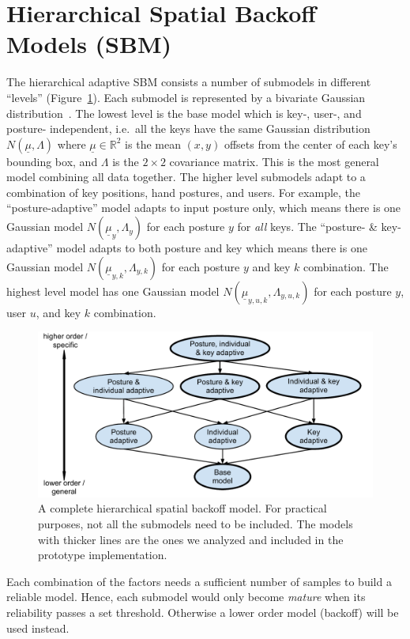 \documentclass{sigchi}
\begin{document}
\section{Hierarchical Spatial Backoff Models (SBM)}
The hierarchical adaptive SBM consists a number of submodels in different
``levels'' (Figure~\ref{fig:hierarchy}). Each submodel is represented by a
bivariate Gaussian distribution~\cite{Azenkot:2012,
Goodman:2002, Rashid:2008}.
The lowest level is the base model which is key-, user-, and posture-
independent, i.e.\ all the keys have the same Gaussian
distribution $N(\underline\mu, \Lambda)$ where $\underline\mu \in \mathbb{R}^2$ is the mean
$(x, y)$ offsets from the center of each key's bounding box, and $\Lambda$ is
the $2\times 2$ covariance matrix. This is the most general model combining all data together. The higher level submodels adapt to a combination of
key positions, hand postures, and users. For example, the ``posture-adaptive'' model adapts to input posture only, which means there is one Gaussian model $N(\underline\mu_y, \Lambda_y)$ for each posture $y$ for \textit{all} keys. The ``posture- \& key-adaptive'' model adapts to both posture and key which means there is one Gaussian model $N(\underline\mu_{y, k}, \Lambda_{y, k})$ for each posture $y$ and key $k$ combination.  The highest level model has one Gaussian model $N(\underline\mu_{y,u,k}, \Lambda_{y,u,k})$ for each posture $y$, user $u$, and key $k$ combination.

\begin{figure}[tb]
 \centering
 \includegraphics[width=0.9\columnwidth]{figures/hierarchy.pdf}
 \caption{A complete hierarchical spatial backoff model. For practical purposes, not all the submodels need to be included. The models with thicker lines are the ones we analyzed and included in the prototype implementation.}
 \label{fig:hierarchy}
\end{figure}

Each combination of the factors needs a sufficient number of samples to build a reliable model. Hence, each submodel would only become \textit{mature} when its reliability passes a set
threshold. Otherwise a lower order model (backoff) will be used instead.
\end{document}
